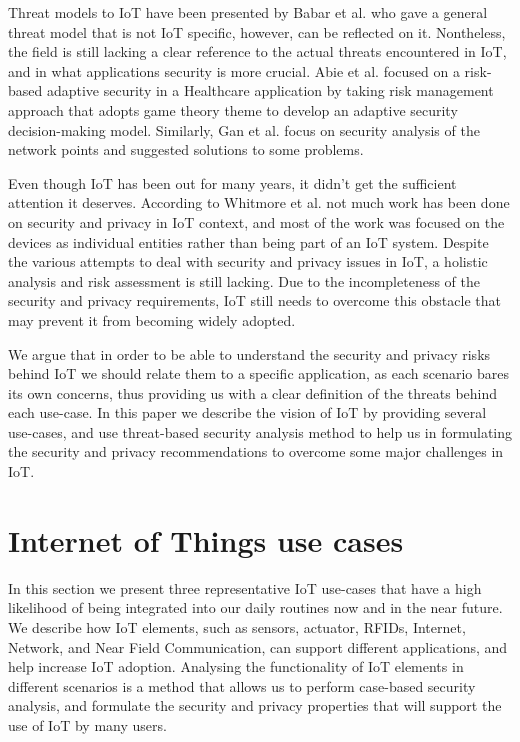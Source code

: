 \documentclass{llncs}
\begin{document}
Threat models to IoT have been presented by Babar et al. \cite{Meghanathan2010} who gave a general threat model that is not IoT specific, however, can be reflected on it. Nontheless, the field is still lacking a clear reference to the actual threats encountered in IoT, and in what applications security is more crucial. Abie et al.\cite{Abie2012} focused on a risk-based adaptive security in a Healthcare application by taking risk management approach that adopts game theory theme to develop an adaptive security decision-making model. Similarly, Gan et al. \cite{Gan2011} focus on security analysis of the network points and suggested solutions to some problems. 

Even though IoT has been out for many years, it didn't get the sufficient attention it deserves. According to Whitmore et al.\cite{Whitmore2014} not much work has been done on security and privacy in IoT context, and most of the work was focused on the devices as individual entities rather than being part of an IoT system. Despite the various attempts to deal with security and privacy issues in IoT, a holistic analysis and risk assessment is still lacking. Due to the incompleteness of the security and privacy requirements, IoT still needs to overcome this obstacle that may prevent it from becoming widely adopted. 

We argue that in order to be able to understand the security and privacy risks behind IoT we should relate them to a specific application, as each scenario bares its own concerns, thus providing us with a clear definition of the threats behind each use-case. In this paper we describe the vision of IoT by providing several use-cases, and use threat-based security analysis method to help us in formulating the security and privacy recommendations to overcome some major challenges in IoT. 


\section{Internet of Things use cases}
\label{sec:use_cases}
In this section we present three representative IoT use-cases that have a high likelihood of being integrated into our daily routines now and in the near future. We describe how IoT elements, such as sensors, actuator, RFIDs, Internet, Network, and Near Field Communication, can support different applications, and help increase IoT adoption. Analysing the functionality of IoT elements in different scenarios is a method that allows us to perform case-based security analysis, and formulate the security and privacy properties that will support the use of IoT by many users. 
\end{document}
